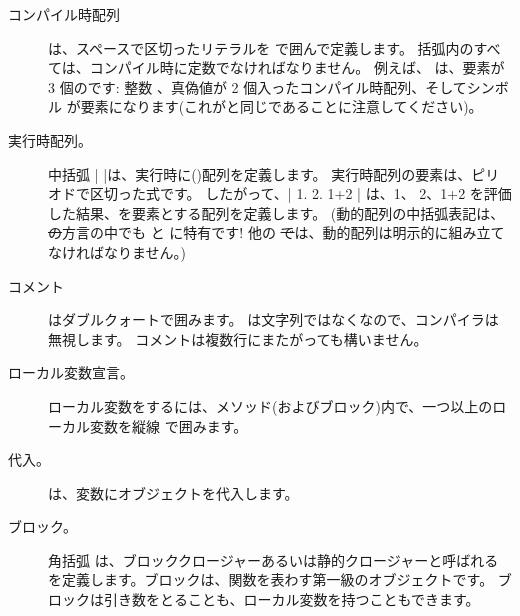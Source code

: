 \documentclass[a4paper,10pt,twoside]{book}
\begin{document}
\begin{description}
\item[コンパイル時配列] は、スペースで区切ったリテラルを \ct{#( )} で囲んで定義します。
		括弧内のすべては、コンパイル時に定数でなければなりません。
		例えば、 は、要素が 3 個のです: 整数 、真偽値が 2 個入ったコンパイル時配列、そしてシンボル  が要素になります(これがと同じであることに注意してください)。

\item[実行時配列。] 中括弧 \ct|{ }|は、実行時に()配列を定義します。
		実行時配列の要素は、ピリオドで区切った式です。
		したがって、\ct|{ 1. 2. 1+2 }| は、1、 2、1+2 を評価した結果、を要素とする配列を定義します。
		(動的配列の中括弧表記は、\st の方言の中でも \pharo と \squeak に特有です!
		他の \st では、動的配列は明示的に組み立てなければなりません。)

\item[コメント] はダブルクォートで囲みます。
		 は文字列ではなくなので、\pharo コンパイラは無視します。
		コメントは複数行にまたがっても構いません。
		
\item[ローカル変数宣言。] ローカル変数をするには、メソッド(およびブロック)内で、一つ以上のローカル変数を縦線 \ct{| |} で囲みます。

\item[代入。] \ct{:=} は、変数にオブジェクトを代入します。

\item[ブロック。] 角括弧 \ct{[ ]} は、ブロッククロージャーあるいは静的クロージャーと呼ばれるを定義します。ブロックは、関数を表わす第一級のオブジェクトです。
		ブロックは引き数をとることも、ローカル変数を持つこともできます。


\end{description}
\end{document}
